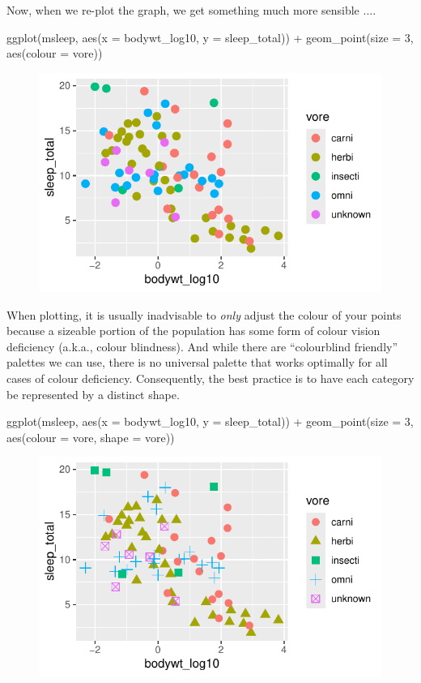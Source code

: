 \vspace{1em}

\noindent
Now, when we re-plot the graph, we get something much more sensible ....

\begin{inR}
ggplot(msleep, aes(x = bodywt_log10, y = sleep_total)) +
    geom_point(size = 3, aes(colour = vore))
\end{inR}
\vspace{2em}
\begin{figure}[H]
\includegraphics[scale = 0.75]{graphics/ch2Figs/ggEx_8.pdf}
\end{figure}

When plotting, it is usually inadvisable to \textit{only} adjust the colour of your points because a sizeable portion of the population has some form of colour vision deficiency (a.k.a., colour blindness). And while there are ``colourblind friendly'' palettes we can use, there is no universal palette that works optimally for all cases of colour deficiency. Consequently, the best practice is to have each category be represented by a distinct shape. 

\begin{inR}
ggplot(msleep, aes(x = bodywt_log10, y = sleep_total)) +
    geom_point(size = 3, aes(colour = vore, shape = vore))
\end{inR}

\vspace{2em}

\begin{figure}[H]
\includegraphics[scale = 0.75]{graphics/ch2Figs/ggEx_9.pdf}
\end{figure}

